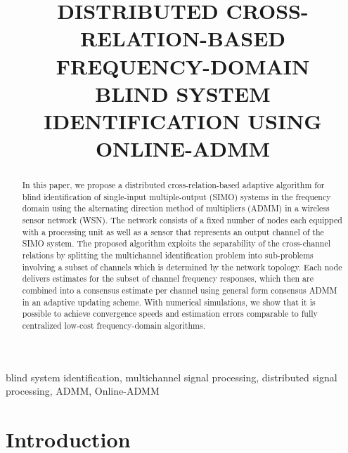 \documentclass{article}
\title{DISTRIBUTED CROSS-RELATION-BASED FREQUENCY-DOMAIN\\ BLIND SYSTEM IDENTIFICATION USING ONLINE-ADMM}
\begin{document}
%
\maketitle
%
\begin{abstract}
    In this paper, we propose a distributed cross-relation-based adaptive algorithm for blind identification of single-input multiple-output (SIMO) systems in the frequency domain using the alternating direction method of multipliers (ADMM) in a wireless sensor network (WSN).
    The network consists of a fixed number of nodes each equipped with a processing unit as well as a sensor that represents an output channel of the SIMO system.
    The proposed algorithm exploits the separability of the cross-channel relations by splitting the multichannel identification problem into sub-problems involving a subset of channels which is determined by the network topology.
    Each node delivers estimates for the subset of channel frequency responses, which then are combined into a consensus estimate per channel using general form consensus ADMM in an adaptive updating scheme.
    With numerical simulations, we show that it is possible to achieve convergence speeds and estimation errors comparable to fully centralized low-cost frequency-domain algorithms.
\end{abstract}
%
\begin{keywords}
    blind system identification, multichannel signal processing, distributed signal processing, ADMM, Online-ADMM
\end{keywords}
%
\section{Introduction}
\label{sec:intro}
\end{document}

